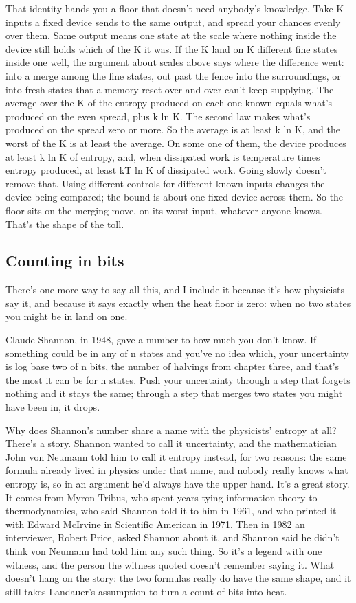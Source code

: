 \documentclass[11pt,twoside]{article}
\theoremstyle{thielethm}
\theoremstyle{thieledef}
\theoremstyle{thieledef}
\theoremstyle{thieledef}
\theoremstyle{thielethm}
\theoremstyle{thieleobs}
\theoremstyle{thielethm}
\begin{document}
That identity hands you a floor that doesn't need anybody's knowledge. Take K inputs a fixed device sends to the same output, and spread your chances evenly over them. Same output means one state at the scale where nothing inside the device still holds which of the K it was. If the K land on K different fine states inside one well, the argument about scales above says where the difference went: into a merge among the fine states, out past the fence into the surroundings, or into fresh states that a memory reset over and over can't keep supplying. The average over the K of the entropy produced on each one known equals what's produced on the even spread, plus k ln K. The second law makes what's produced on the spread zero or more. So the average is at least k ln K, and the worst of the K is at least the average. On some one of them, the device produces at least k ln K of entropy, and, when dissipated work is temperature times entropy produced, at least kT ln K of dissipated work. Going slowly doesn't remove that. Using different controls for different known inputs changes the device being compared; the bound is about one fixed device across them. So the floor sits on the merging move, on its worst input, whatever anyone knows. That's the shape of the toll.

\subsection{Counting in bits}

There's one more way to say all this, and I include it because it's how physicists say it, and because it says exactly when the heat floor is zero: when no two states you might be in land on one.

Claude Shannon, in 1948, gave a number to how much you don't know. If something could be in any of n states and you've no idea which, your uncertainty is log base two of n bits, the number of halvings from chapter three, and that's the most it can be for n states. Push your uncertainty through a step that forgets nothing and it stays the same; through a step that merges two states you might have been in, it drops.

Why does Shannon's number share a name with the physicists' entropy at all? There's a story. Shannon wanted to call it uncertainty, and the mathematician John von Neumann told him to call it entropy instead, for two reasons: the same formula already lived in physics under that name, and nobody really knows what entropy is, so in an argument he'd always have the upper hand. It's a great story. It comes from Myron Tribus, who spent years tying information theory to thermodynamics, who said Shannon told it to him in 1961, and who printed it with Edward McIrvine in Scientific American in 1971. Then in 1982 an interviewer, Robert Price, asked Shannon about it, and Shannon said he didn't think von Neumann had told him any such thing. So it's a legend with one witness, and the person the witness quoted doesn't remember saying it. What doesn't hang on the story: the two formulas really do have the same shape, and it still takes Landauer's assumption to turn a count of bits into heat.
\end{document}
